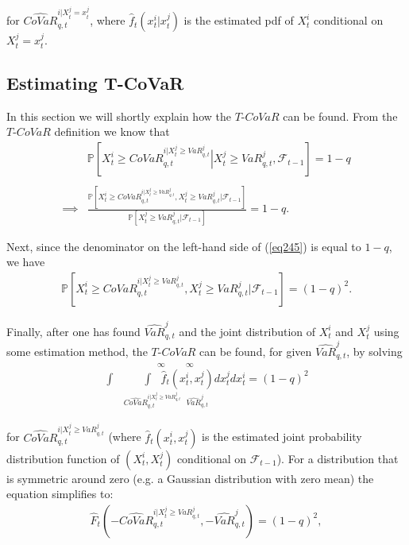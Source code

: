 \documentclass[12pt]{article}
\begin{document}
\noindent for $\widehat{CoVaR}_{q,t}^{i|X_{t}^{j}= x_{t}^{j}}$, where $\widehat{f}_t\left(x^i_t\big|x^j_t\right)$ is the estimated pdf of $X^i_t$ conditional on $X^j_t=x^j_t$.


\subsection{Estimating T-CoVaR} \label{estcov}


In this section we will shortly explain how the $T$-$CoVaR$ can be found. From the $T$-$CoVaR$ definition we know that
\begin{align}
& \mathbb{P}\left[X^{i}_t\geq CoVaR_{q,t}^{i|X^{j}_t\geq VaR_{q,t}^{j}}\left|X^{j}_t\geq VaR_{q,t}^{j},\mathcal{F}_{t-1}\right.\right]=1-q \\
\nonumber\ \\
\implies & \frac{\mathbb{P}\left[X^{i}_t\geq CoVaR_{q,t}^{i|X^{j}_t\geq VaR_{q,t}^{j}},X^{j}_t\geq VaR_{q,t}^{j}\Big|\mathcal{F}_{t-1}\right]}
{\mathbb{P}\left[X^{j}_t\geq VaR_{q,t}^{j}\Big|\mathcal{F}_{t-1}\right]}=1-q  . \label{eq245}
\end{align}

\noindent Next, since the denominator on the left-hand side of (\ref{eq245}) is equal to $1-q$, we have
\begin{align}
\mathbb{P}\left[X^{i}_t\geq CoVaR_{q,t}^{i|X^{j}_t\geq VaR_{q,t}^{j}},X^{j}_t\geq VaR_{q,t}^{j}\Big|\mathcal{F}_{t-1}\right]=(1-q)^2 .
\end{align}


\noindent Finally, after one has found $\widehat{VaR}_{q,t}^{j}$ and the joint distribution of $X^i_t$ and $X^j_t$ using some estimation method, the $T$-$CoVaR$ can be found, for given $\widehat{VaR}_{q,t}^{j}$, by solving
\begin{align}
\stackrel{\ \ \infty \ \ \ \ \ \ \ \ \ \ \ \ \infty \ \ \ \ \ \ \ \ \ \ \ \ \ \ \ \ \ \ \ \ \ \ \ \ \ \ \ \ \ \ \ \ \ \ \ \ \ \ }
{\underset{\widehat{CoVaR}_{q,t}^{i|X_{t}^{j}\geq VaR_{q,t}^{j}} \ \ \ \widehat{VaR}_{q,t}^{j}\ \ \ \ \ \ \ \ \ \ \ \ \ \ \ \ \ \ \ \ \ \ \ \ \ \ \ \ \ \ \ \ \ \ \ \ \ \ \ \ \ \ \ \ \ \ \ }
{\int \ \ \ \ \ \ \ \ \ \ \  \int \ \ \ \widehat{f}_{t}(x_{t}^{i},x_{t}^{j})dx_{t}^{j}dx_{t}^{i}  = (1-q)^2  }}
\end{align}

\noindent for $\widehat{CoVaR}_{q,t}^{i|X_{t}^{j}\geq VaR_{q,t}^{j}}$ (where  $\widehat{f}_t(x^i_t,x^j_t)$ is the estimated joint probability distribution function of $(X^i_t,X^j_t)$ conditional on $\mathcal{F}_{t-1}$). For a distribution that is symmetric around zero (e.g. a Gaussian distribution with zero mean) the equation simplifies to:
\begin{align}
\widehat{F}_t\left(-\widehat{CoVaR}_{q,t}^{i|X_{t}^{j}\geq VaR_{q,t}^{j}},-\widehat{VaR}_{q,t}^{j}\right) = (1-q)^2 ,
\end{align}
\end{document}
